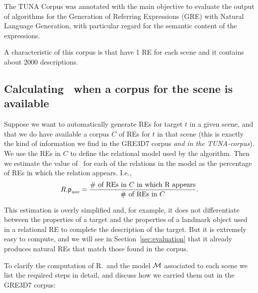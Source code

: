 The TUNA Corpus was annotated with the main objective to evaluate the output of algorithms for the Generation of Referring Expressions (GRE) with Natural Language Generation, with particular regard for the semantic content of the expressions.

A characteristic of this corpus is that have 1 RE for each scene and it contains about 2000 descriptions.


\subsection{Calculating \puse\ when a corpus for the scene is available}

Suppose we want to automatically generate REs for target $t$ in a given scene, and that we do have available a corpus $C$ 
of REs for $t$ in that scene (this is exactly the kind of information we find in the GRE3D7 corpus \textit{and in the TUNA-corpus}).  
We use the REs in $C$ to define the relational model 
used by the algorithm.  Then we estimate the value of \puse\ for each of the relations in the model as the percentage of REs 
in which the relation appears.  I.e., 
\begin{equation}\label{eq1}
R.\textsf{p}_\textit{use} = \frac{\# \mbox{ of REs in $C$ in which R appears}}{\# \mbox{ of REs in $C$}}.
\end{equation}

\noindent
This estimation is overly simplified and, for example, it does not differentiate between the properties of a target and the 
properties of a landmark object used in a relational RE to complete the description of the target.  But it is extremely easy 
to compute, and we will see in Section~\ref{sec:evaluation} that it already produces natural REs that match those found in the corpus. 

To clarify the computation of R.\puse\ and the model $\mathcal{M}$ associated to each scene we list the required steps in detail, 
and discuss how we carried them out in the GRE3D7 corpus:

